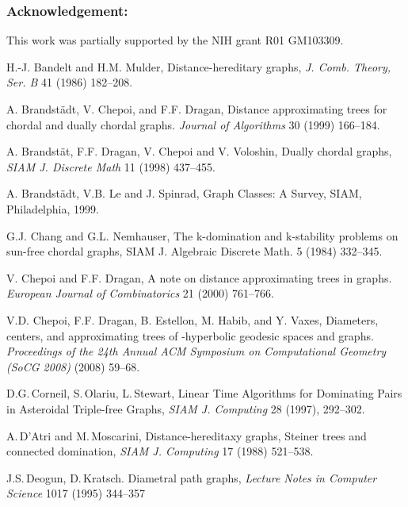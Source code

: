 \documentclass[10pt]{llncs}
\begin{document}
\subsubsection{Acknowledgement:}
This work was partially supported by the NIH grant R01 GM103309.


\begin{thebibliography}{99}

    H.-J. Bandelt and H.M. Mulder, 
    Distance-hereditary graphs, 
    \emph{J. Comb. Theory, Ser. B} 41 (1986) 182--208.

    A. Brandstädt, V. Chepoi, and F.F. Dragan,
    Distance approximating trees for chordal and dually chordal graphs.
    \emph{Journal of Algorithms} 30 (1999) 166--184.

    A. Brandstät, F.F. Dragan, V. Chepoi and V. Voloshin,
    Dually chordal graphs,
    \emph{SIAM J. Discrete Math} 11 (1998) 437--455.

    A. Brandstädt, V.B. Le and J. Spinrad,
    Graph Classes: A Survey,
    SIAM, Philadelphia, 1999.

     G.J. Chang and G.L. Nemhauser, 
     The k-domination and k-stability problems on sun-free chordal graphs, 
     SIAM J. Algebraic Discrete Math. 5 (1984) 332--345.

    V. Chepoi and F.F. Dragan,
    A note on distance approximating trees in graphs.
    \emph{European Journal of Combinatorics} 21 (2000) 761--766.

    V.D. Chepoi, F.F. Dragan, B. Estellon, M. Habib, and Y. Vaxes,
    Diameters, centers, and approximating trees of -hyperbolic geodesic spaces and graphs.
    \emph{Proceedings of the 24th Annual ACM Symposium on Computational Geometry (SoCG 2008)} (2008) 59--68.

    D.G.\,Corneil, S.\,Olariu, L.\,Stewart,
    Linear Time Algorithms for Dominating Pairs in Asteroidal Triple-free Graphs,
    \emph{SIAM J. Computing} 28 (1997), 292--302.

    A.\,D'Atri and M.\,Moscarini,
    Distance-hereditaxy graphs, Steiner trees and connected domination, 
    \emph{SIAM J. Computing} 17 (1988) 521--538.

    J.S.\,Deogun, D.\,Kratsch. 
    Diametral path graphs,
    \emph{Lecture Notes in Computer Science} 1017 (1995) 344--357 


\end{thebibliography}
\end{document}

